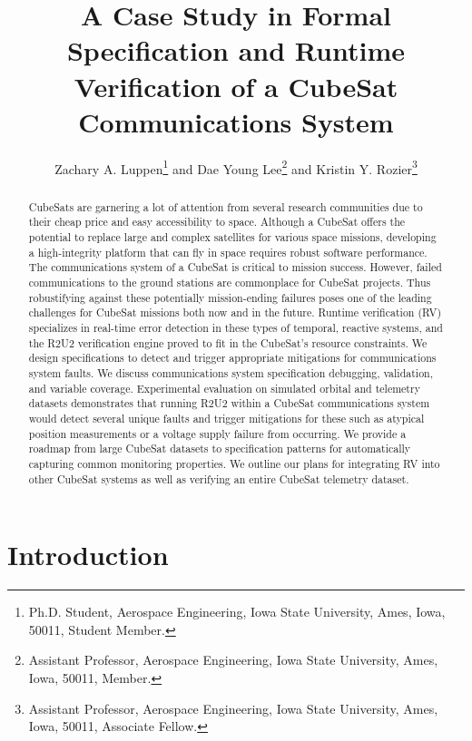 \documentclass[conf]{new-aiaa}
\title{A Case Study in Formal Specification and Runtime Verification of a CubeSat Communications System}
\author{Zachary A. Luppen\footnote{Ph.D. Student, Aerospace Engineering, Iowa State University, Ames, Iowa, 50011, Student Member.} and Dae Young Lee\footnote{Assistant Professor, Aerospace Engineering, Iowa State University, Ames, Iowa, 50011, Member.} and Kristin Y. Rozier\footnote{Assistant Professor, Aerospace Engineering, Iowa State University, Ames, Iowa, 50011, Associate Fellow.}}
\affil{Iowa State University, \{zaluppen,kyrozier,daylee\}@iastate.edu}
\begin{document}
\maketitle

\begin{abstract}

CubeSats are garnering a lot of attention from several research communities due to their cheap price and easy accessibility to space. Although a CubeSat offers the potential to replace large and complex satellites for various space missions, developing a high-integrity platform that can fly in space requires robust software performance. The communications system of a CubeSat %
is critical to mission success. However, failed communications to the ground stations are commonplace for CubeSat projects. Thus robustifying against these potentially mission-ending failures poses one of the leading challenges for CubeSat missions both now and in the future. %
Runtime verification (RV) specializes in real-time error detection in these types of temporal, reactive systems, and the R2U2 verification engine proved to fit in the CubeSat's resource constraints. We design specifications to detect and trigger appropriate mitigations for communications system faults. We discuss communications system specification debugging, validation, and variable coverage. Experimental evaluation on simulated orbital and telemetry datasets demonstrates that running R2U2 within a CubeSat communications system would detect several unique faults and trigger mitigations for these such as atypical position measurements or a voltage supply failure from occurring. We provide a roadmap from large CubeSat datasets to specification patterns for automatically capturing common monitoring properties. We outline our plans for integrating RV into other CubeSat systems as well as verifying an entire CubeSat telemetry dataset.

\end{abstract}


\section{Introduction}
\end{document}
